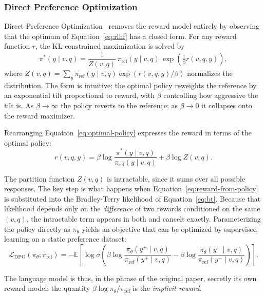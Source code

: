 \subsubsection{Direct Preference Optimization}

Direct Preference Optimization~\cite{rafailov2023direct} removes the reward model entirely by observing that the optimum of Equation~\ref{eq:rlhf} has a closed form. For any reward function $r$, the KL-constrained maximization is solved by
\begin{equation}\label{eq:optimal-policy}
\pi^{*}(y \mid v,q) = \frac{1}{Z(v,q)}\, \pi_{\text{ref}}(y \mid v,q)\, \exp\!\left(\tfrac{1}{\beta} r(v,q,y)\right),
\end{equation}
where $Z(v,q) = \sum_{y} \pi_{\text{ref}}(y \mid v,q)\exp(r(v,q,y)/\beta)$ normalizes the distribution. The form is intuitive: the optimal policy reweights the reference by an exponential tilt proportional to reward, with $\beta$ controlling how aggressive the tilt is. As $\beta \to \infty$ the policy reverts to the reference; as $\beta \to 0$ it collapses onto the reward maximizer.

Rearranging Equation~\ref{eq:optimal-policy} expresses the reward in terms of the optimal policy:
\begin{equation}\label{eq:reward-from-policy}
r(v,q,y) = \beta \log \frac{\pi^{*}(y \mid v,q)}{\pi_{\text{ref}}(y \mid v,q)} + \beta \log Z(v,q).
\end{equation}

The partition function $Z(v,q)$ is intractable, since it sums over all possible responses. The key step is what happens when Equation~\ref{eq:reward-from-policy} is substituted into the Bradley-Terry likelihood of Equation~\ref{eq:bt}. Because that likelihood depends only on the \emph{difference} of two rewards conditioned on the same $(v,q)$, the intractable term appears in both and cancels exactly. Parameterizing the policy directly as $\pi_\theta$ yields an objective that can be optimized by supervised learning on a static preference dataset:
\begin{equation}\label{eq:dpo-derived}
\mathcal{L}_{\text{DPO}}(\pi_\theta; \pi_{\text{ref}}) = -\mathbb{E}\left[\log \sigma\left(\beta \log \frac{\pi_\theta(y^+ \mid v,q)}{\pi_{\text{ref}}(y^+ \mid v,q)} - \beta \log \frac{\pi_\theta(y^- \mid v,q)}{\pi_{\text{ref}}(y^- \mid v,q)}\right)\right].
\end{equation}

The language model is thus, in the phrase of the original paper, secretly its own reward model: the quantity $\beta \log \pi_\theta / \pi_{\text{ref}}$ is the \emph{implicit reward}.

